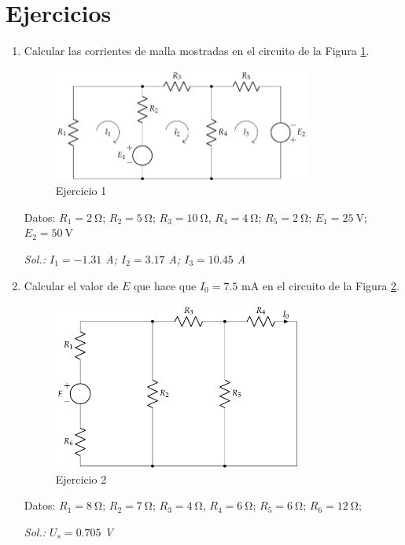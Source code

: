 \section{Ejercicios}

\begin{enumerate}
\item Calcular las corrientes de malla mostradas en el circuito de la
  Figura \ref{fig.ejercicio2_tema1}.
  \begin{figure}[H]
    \centering \includegraphics[height=3.7cm]{../figs/ej2_BT1.pdf}
    \caption{Ejercicio 1}
    \label{fig.ejercicio2_tema1}
  \end{figure}
  Datos: $R_1 = \qty{2}{\ohm}$; $R_2 = \qty{5}{\ohm}$; $R_3 = \qty{10}{\ohm}$, $R_4 = \qty{4}{\ohm}$; $R_5 = \qty{2}{\ohm}$; $E_1 = \qty{25}{\volt}$; $E_2 = \qty{50}{\volt}$

  \emph{Sol.: $I_1=-1.31$ A; $I_2=3.17$ A; $I_3=10.45$ A}
		
\item Calcular el valor de $E$ que hace que $I_0=7.5$ mA en el
  circuito de la Figura \ref{fig.ejercicio3_tema1}.
  \begin{figure}[H]
    \centering \includegraphics[height=5.5cm]{../figs/ej3_BT1.pdf}
    \caption{Ejercicio 2}
    \label{fig.ejercicio3_tema1}
  \end{figure}

  Datos: $R_1 = \qty{8}{\ohm}$; $R_2 = \qty{7}{\ohm}$; $R_3 = \qty{4}{\ohm}$, $R_4 = \qty{6}{\ohm}$; $R_5 = \qty{6}{\ohm}$; $R_6 = \qty{12}{\ohm}$; 

  \emph{Sol.: $U_s=0.705$ V}
		

\end{enumerate}
